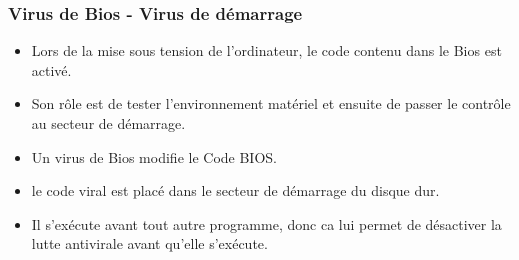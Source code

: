 \documentclass{beamer}
\begin{document}







\begin{frame}
\frametitle{Virus de Bios - Virus de démarrage}
\begin{itemize}
\item Lors de la mise sous tension de l'ordinateur, le code contenu dans le Bios est activé. 
\item Son rôle est de tester l'environnement matériel et ensuite de passer le contrôle au secteur de démarrage.
\item Un virus de Bios modifie le Code BIOS.
\end{itemize}
\begin{itemize}
\item le code viral est placé dans le secteur de démarrage du disque dur.
  \item Il s'exécute avant tout autre programme, donc ca lui permet de désactiver la lutte antivirale avant qu'elle s'exécute.
  \end{itemize}
\end{frame}

\end{document}
